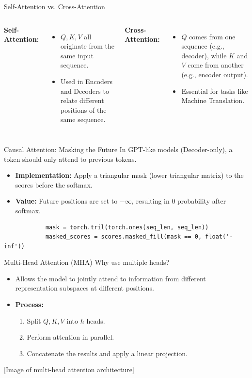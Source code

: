 \documentclass[aspectratio=169]{beamer}
\begin{document}
	\begin{frame}{Self-Attention vs. Cross-Attention}
		\begin{columns}
			\textbf{Self-Attention:}
			\begin{itemize}
				\item $Q, K, V$ all originate from the same input sequence.
				\item Used in Encoders and Decoders to relate different positions of the same sequence.
			\end{itemize}
			
			\textbf{Cross-Attention:}
			\begin{itemize}
				\item $Q$ comes from one sequence (e.g., decoder), while $K$ and $V$ come from another (e.g., encoder output).
				\item Essential for tasks like Machine Translation.
			\end{itemize}
		\end{columns}
	\end{frame}
	
	\begin{frame}[fragile]{Causal Attention: Masking the Future}
		In GPT-like models (Decoder-only), a token should only attend to previous tokens.
		\begin{itemize}
			\item \textbf{Implementation:} Apply a triangular mask (lower triangular matrix) to the scores before the softmax.
			\item \textbf{Value:} Future positions are set to $-\infty$, resulting in 0 probability after softmax.
		\end{itemize}
		
		\begin{lstlisting}
			mask = torch.tril(torch.ones(seq_len, seq_len))
			masked_scores = scores.masked_fill(mask == 0, float('-inf'))
		\end{lstlisting}
	\end{frame}
	
	\begin{frame}{Multi-Head Attention (MHA)}
		Why use multiple heads?
		\begin{itemize}
			\item Allows the model to jointly attend to information from different representation subspaces at different positions.
			\item \textbf{Process:} 
			\begin{enumerate}
				\item Split $Q, K, V$ into $h$ heads.
				\item Perform attention in parallel.
				\item Concatenate the results and apply a linear projection.
			\end{enumerate}
		\end{itemize}
		[Image of multi-head attention architecture]
	\end{frame}
	
\end{document}
